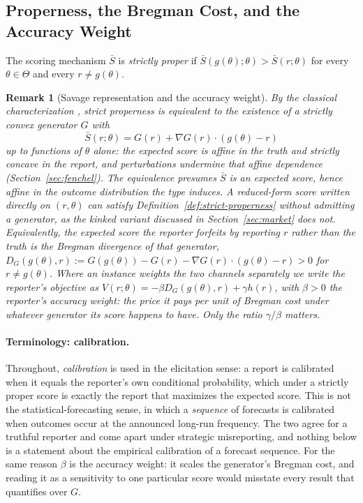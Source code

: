 \documentclass[acmsmall,nonacm,screen]{acmart}
\theoremstyle{acmplain}%
\theoremstyle{acmdefinition}%
\newtheorem{remark}[theorem]{Remark}%
\newcommand{\Sbar}{\bar{S}}
\numberwithin{equation}{section}
\begin{document}
\subsection{Properness, the Bregman Cost, and the Accuracy Weight}

\begin{definition}\label{def:strict-properness}
The scoring mechanism $\Sbar$ is \emph{strictly proper} if $\Sbar(g(\theta);\theta) > \Sbar(r;\theta)$ for every $\theta \in \Theta$ and every $r \neq g(\theta)$.
\end{definition}

\begin{remark}[Savage representation and the accuracy weight]\label{rem:savage-characterization}
By the classical characterization \citep{savage1971elicitation,mccarthy1956measures,gneiting2007strictly,schervish1989general}, strict properness is equivalent to the existence of a strictly convex \emph{generator} $G$ with
\[
\Sbar(r;\theta) = G(r) + \nabla G(r) \cdot (g(\theta) - r)
\]
up to functions of $\theta$ alone: the expected score is affine in the truth and strictly concave in the report, and perturbations undermine that affine dependence (Section~\ref{sec:fenchel}). The equivalence presumes $\Sbar$ is an expected score, hence affine in the outcome distribution the type induces. A reduced-form score written directly on $(r,\theta)$ can satisfy Definition~\ref{def:strict-properness} without admitting a generator, as the kinked variant discussed in Section~\ref{sec:market} does not. Equivalently, the expected score the reporter forfeits by reporting $r$ rather than the truth is the Bregman divergence of that generator, $D_G(g(\theta), r) := G(g(\theta)) - G(r) - \nabla G(r) \cdot (g(\theta) - r) > 0$ for $r \neq g(\theta)$. Where an instance weights the two channels separately we write the reporter's objective as $V(r;\theta) = -\beta D_G(g(\theta),r) + \gamma h(r)$, with $\beta > 0$ the reporter's \emph{accuracy weight}: the price it pays per unit of Bregman cost under whatever generator its score happens to have. Only the ratio $\gamma/\beta$ matters.
\end{remark}

\paragraph{Terminology: calibration.}
Throughout, \emph{calibration} is used in the elicitation sense: a report is calibrated when it equals the reporter's own conditional probability, which under a strictly proper score is exactly the report that maximizes the expected score. This is not the statistical-forecasting sense, in which a \emph{sequence} of forecasts is calibrated when outcomes occur at the announced long-run frequency. The two agree for a truthful reporter and come apart under strategic misreporting, and nothing below is a statement about the empirical calibration of a forecast sequence. For the same reason $\beta$ is the accuracy weight: it scales the generator's Bregman cost, and reading it as a sensitivity to one particular score would misstate every result that quantifies over $G$.
\end{document}

